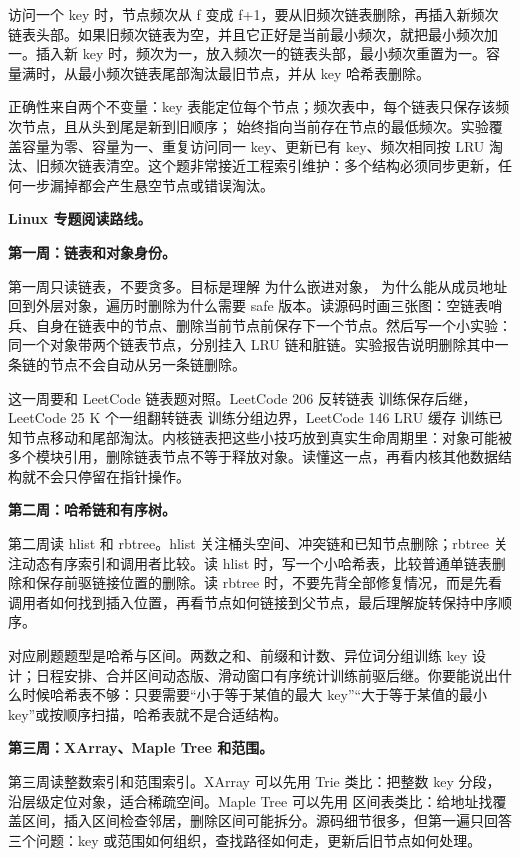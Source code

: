 访问一个 key 时，节点频次从 f 变成 f+1，要从旧频次链表删除，再插入新频次链表头部。如果旧频次链表为空，并且它正好是当前最小频次，就把最小频次加一。插入新 key 时，频次为一，放入频次一的链表头部，最小频次重置为一。容量满时，从最小频次链表尾部淘汰最旧节点，并从 key 哈希表删除。

正确性来自两个不变量：key 表能定位每个节点；频次表中，每个链表只保存该频次节点，且从头到尾是新到旧顺序； 始终指向当前存在节点的最低频次。实验覆盖容量为零、容量为一、重复访问同一 key、更新已有 key、频次相同按 LRU 淘汰、旧频次链表清空。这个题非常接近工程索引维护：多个结构必须同步更新，任何一步漏掉都会产生悬空节点或错误淘汰。

\noindent\textbf{Linux 专题阅读路线。}

\noindent\textbf{第一周：链表和对象身份。}

第一周只读链表，不要贪多。目标是理解  为什么嵌进对象， 为什么能从成员地址回到外层对象，遍历时删除为什么需要 safe 版本。读源码时画三张图：空链表哨兵、自身在链表中的节点、删除当前节点前保存下一个节点。然后写一个小实验：同一个对象带两个链表节点，分别挂入 LRU 链和脏链。实验报告说明删除其中一条链的节点不会自动从另一条链删除。

这一周要和 LeetCode 链表题对照。LeetCode 206 反转链表 训练保存后继，LeetCode 25 K 个一组翻转链表 训练分组边界，LeetCode 146 LRU 缓存 训练已知节点移动和尾部淘汰。内核链表把这些小技巧放到真实生命周期里：对象可能被多个模块引用，删除链表节点不等于释放对象。读懂这一点，再看内核其他数据结构就不会只停留在指针操作。

\noindent\textbf{第二周：哈希链和有序树。}

第二周读 hlist 和 rbtree。hlist 关注桶头空间、冲突链和已知节点删除；rbtree 关注动态有序索引和调用者比较。读 hlist 时，写一个小哈希表，比较普通单链表删除和保存前驱链接位置的删除。读 rbtree 时，不要先背全部修复情况，而是先看调用者如何找到插入位置，再看节点如何链接到父节点，最后理解旋转保持中序顺序。

对应刷题题型是哈希与区间。两数之和、前缀和计数、异位词分组训练 key 设计；日程安排、合并区间动态版、滑动窗口有序统计训练前驱后继。你要能说出什么时候哈希表不够：只要需要“小于等于某值的最大 key”“大于等于某值的最小 key”或按顺序扫描，哈希表就不是合适结构。

\noindent\textbf{第三周：XArray、Maple Tree 和范围。}

第三周读整数索引和范围索引。XArray 可以先用 Trie 类比：把整数 key 分段，沿层级定位对象，适合稀疏空间。Maple Tree 可以先用  区间表类比：给地址找覆盖区间，插入区间检查邻居，删除区间可能拆分。源码细节很多，但第一遍只回答三个问题：key 或范围如何组织，查找路径如何走，更新后旧节点如何处理。

